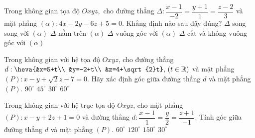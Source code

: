 	\begin{ex}%
	Trong không gian tọa độ $Oxyz,$ cho đường thẳng $\Delta\colon \dfrac{x-1}{-2}=\dfrac{y+1}1=\dfrac{z-2}{3}$ và mặt phẳng $(\alpha)\colon 4x-2y-6z+5=0.$ Khẳng định nào sau đây đúng?
	\choice
	{$\Delta$ song song với $(\alpha)$}
	{$\Delta$ nằm trên $(\alpha)$}
	{\True $\Delta$ vuông góc với $(\alpha)$}
	{$\Delta$ cắt và không vuông góc với $(\alpha)$}
	\end{ex}
	\begin{ex}%
	Trong không gian với hệ tọa độ $Oxyz$, cho đường thẳng $d: \heva{&x=5+t\\ &y=-2+t\\ &z=4+\sqrt{2}t},\, (t\in\mathbb{R})$ và mặt phẳng $(P): x-y+\sqrt{2}z-7=0$. Hãy xác định góc giữa đường thẳng $d$ và mặt phẳng $(P)$.
	\choice
	{$90^\circ$}
	{$45^\circ$}
	{\True $30^\circ$}
	{$60^\circ$}
	\end{ex}
	\begin{ex}%
	Trong không gian với hệ trục tọa độ $Oxyz$, cho mặt phẳng $(P) \colon x-y+2z+1=0$ và đường thẳng $d: \dfrac{x-1}{1}=\dfrac{y}{2}=\dfrac{z+1}{-1}$. Tính góc giữa đường thẳng $d$ và mặt phẳng $(P)$.
	\choice
	{$60^{\circ} $}
	{$120^{\circ} $}
	{$150^{\circ} $}
	{\True $30^{\circ} $}
	\end{ex}
